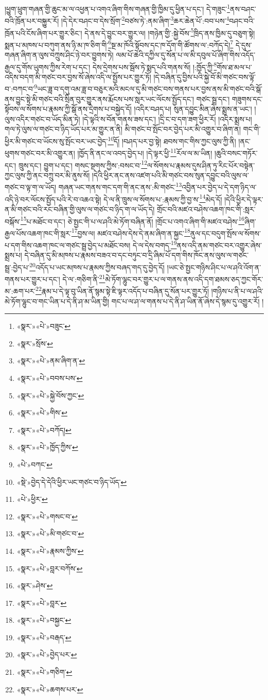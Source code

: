 །ཕྱུག་ཕྲུག་གཞན་གྱི་ཆུང་མ་ལ་འཕྱན་པ་འགའ་ཞིག་གིས་གཞན་གྱི་ཁྱིམ་དུ་ཕྱིན་པ་དང་། དེ་གཟུང་\footnote{«སྣར་»«པེ་»བཟུང་}ནས་བཤང་བའི་ཁྲོན་པར་བསྐྱུར་རོ། །དེ་དེར་བཤང་བ་དེས་སྲོག་\footnote{«སྣར་»སྲོས་}བཙས་ཏེ་:ནམ་ཞིག་\footnote{«སྣར་»«པེ་»ནམ་ཞིག་ན་}ཆར་ཆེན་པོ་:བབ་པས་\footnote{«སྣར་»«པེ་»བབས་པས་}བཤང་བའི་ཁྲོན་པའི་ངོས་ཞིག་པར་གྱུར་ཅིང་། དེ་ནས་དེ་བྱུང་བར་གྱུར་ལ། །གཉེན་གྱི་:སྐྱེ་བོས་\footnote{«སྣར་»«པེ་»སྐྱེ་བོས་ཀྱང་}ཁྲིད་ནས་ཁྱིམ་དུ་བཅུག་སྟེ། སྨན་པ་མཁས་པ་བཀུག་ནས་ཉི་མ་ཁ་ཅིག་གི་\footnote{«སྣར་»«པེ་»གིས་}སྔ་མ་ཁོའི་སྟོབས་དང་ཁ་དོག་གི་ཚོགས་ལ་:བཀོད་དེ།\footnote{«སྣར་»«པེ་»བཀོད།} དེ་དུས་གཞན་ཞིག་ན་ལུས་བཀྲུས་ཤིང་ཉེ་བར་བྱུགས་ཏེ། ལམ་པོ་ཆེའི་དཀྱིལ་དུ་སོན་པ་ལ་མི་དབུལ་པོ་ཞིག་གིས་འདོད་རྒྱལ་དུ་གོས་ཡུགས་ཀྱིས་རེག་པ་དང་། དེས་དྲེགས་པས་སྦོས་ཏེ་སྨད་པའི་གནས་སོ། །:ཁྱོད་ཀྱི་\footnote{«སྣར་»«པེ་»ཁྱོད་ཀྱིས་}གོས་ཐ་མལ་པ་འདིས་བདག་མི་གཙང་བར་བྱས་སོ་ཞེས་འདི་ལ་སྤྱོས་པར་གྱུར་ཏོ། །དེ་བཞིན་དུ་བྱིས་པའི་སྐྱེ་བོ་མི་གཙང་བས་ལྟོ་བ་:བཀང་བ་\footnote{«པེ་»བཀང་}ཡང་ཟླ་བ་དགུ་འམ་ཟླ་བ་བཅུར་མའི་མངལ་དུ་མི་གཙང་བས་གནས་པར་བྱས་ནས་མི་གཙང་བའི་སྒོ་ནས་བྱུང་སྟེ་མི་གཙང་བའི་སྲིན་བུར་གྱུར་ནས་རྨོངས་པས་སླར་ཡང་ལོངས་སྤྱོད་དང་། གཙང་སྦྲ་དང་། གཟུགས་དང་སྟོབས་ལ་སོགས་པ་རྣམས་ཀྱི་སྒོ་ནས་དྲེགས་པ་བསྐྱེད་དོ། །འདིར་བཤད་པ། སུན་དབྱུང་མིན་ཞེས་སྨྲས་ན་ཡང་། །ལུས་འདིར་གཙང་བ་ཡོད་མིན་ཏེ། །དེ་ལྟའི་ས་བོན་གནས་ཟས་དང་། །དྲི་ང་བ་དག་ཟག་ཕྱིར་རོ། །འདིར་སྨྲས་པ། གལ་ཏེ་ལུས་ལ་གཙང་བ་ཉིད་ཡོད་པར་མ་གྱུར་ན་ནི། མི་གཙང་བ་སྤོང་བར་བྱེད་པར་མི་འགྱུར་བ་ཞིག་ན། གང་གི་ཕྱིར་མི་གཙང་བ་ཡོངས་སུ་སྤོང་བར་ཡང་བྱེད་\footnote{«སྡེ་»བྱེད་དེ་དེའི་ཕྱིར་ཡང་གཙང་བ་ཉིད་ཡོད་}དོ། །བཤད་པར་བྱ་སྟེ། ཐབས་གང་གིས་ཀྱང་ལུས་ཀྱི་ནི། །ནང་ཕུགས་གཙང་བར་མི་འགྱུར་ན། །ཁྱོད་ནི་ནང་ལ་འབད་བྱེད་པ། །དེ་ལྟར་ཕྱི་\footnote{«པེ་»ཕྱིར་}རོལ་ལ་མ་ཡིན། །ཆུའི་བསང་གཏོར་དང་། ཁྲུས་དང་། བྱུག་པ་དང་། གསང་སྔགས་ཀྱིས་:བསང་བ་\footnote{«སྣར་»«པེ་»གསང་བ་}ལ་སོགས་པ་རྣམས་དུས་ཤིན་ཏུ་རིང་པོར་བསྟེན་ཀྱང་ལུས་ཀྱི་ནང་བཀྲུ་བར་མི་ནུས་སོ། །དེའི་ཕྱིར་ནང་ནས་འཛག་པའི་མི་གཙང་བས་སུན་དབྱུང་བའི་ལུས་ལ་གཙང་བ་ལྟ་ག་ལ་ཡོད། གཞན་ཡང་གནས་གང་དག་གི་ནང་ནས་:མི་གཙང་\footnote{«སྣར་»«པེ་»མི་གཙང་བ་}འབྱིན་པར་བྱེད་པ་དེ་དག་ཉིད་ལ་འདི་ཉེ་བར་ལོངས་སྤྱོད་པའི་རེ་བ་འཆའ་སྟེ། དེ་ལ་ནི་ཁྲུས་ལ་སོགས་པ་:རྣམས་ཀྱི་བྱ་ས་\footnote{«སྣར་»«པེ་»རྣམས་ཀྱིས་}མེད་དོ། །དེའི་ཕྱིར་དེ་ལྟར་ན་མི་གཙང་བའི་རང་བཞིན་གྱི་ལུས་ལ་གཙང་བ་ཉིད་ག་ལ་ཡོད་དེ། གྲོང་བའི་མཛའ་བཤེས་འཆག་ཁང་གི་:སླར་བསྐོས་\footnote{«སྣར་»«པེ་»བླར་བཀོས་}པ་མཐོང་བ་དང་། ཅེ་སྤྱང་གི་པ་ལ་ཤའི་མེ་ཏོག་བཞིན་ནོ། །གྲོང་པ་འགའ་ཞིག་གི་མཛའ་བཤེས་\footnote{«སྣར་»ཤེས་}ཞིག་རྒྱལ་པོས་འཆག་ཁང་གི་སླར་\footnote{«སྣར་»«པེ་»བླར་}བྱས་ལ། མཛའ་བཤེས་དེས་དེ་ནམ་ཞིག་ན་སྐྱང་\footnote{«སྣར་»«པེ་»བསྐྱང་}ནུལ་དང་བདུག་སྤོས་ལ་སོགས་པ་དག་གིས་འཆག་ཁང་ལ་གཙང་སྦྲ་བྱེད་པ་མཐོང་བས། དེ་ལ་དེས་བགད་\footnote{«སྣར་»«པེ་»བརྒད་}ནས་འདི་ནམ་གཙང་བར་འགྱུར་ཞེས་སྨྲས་པ། དེ་བཞིན་དུ་མི་མཁས་པ་རྣམས་བཟའ་བ་དང་བཏུང་བ་དྲི་ཞིམ་པོ་དག་གིས་ཁོང་ནས་ལུས་ལ་གཙང་སྦྲ་:བྱེད་པ་\footnote{«སྣར་»«པེ་»བྱེད་པར་}འདོད་པ་ཡང་མཁས་པ་རྣམས་ཀྱིས་བཞད་གད་དུ་བྱེད་དོ། །ཡང་ཅེ་སྤྱང་གཉིས་ཤིང་པ་ལ་ཤའི་འོག་ན་གནས་པར་གྱུར་པ་དང་། དེ་ལ་:གཅིག་ནི་\footnote{«སྣར་»«པེ་»གཅིག་}མེ་ཏོག་ལྷུང་བར་གྱུར་པ་ལ་གནས་ནས་འདི་དག་ཐམས་ཅད་ཀྱང་གོར་མ་:ཆག་པར་\footnote{«སྣར་»«པེ་»ཆགས་པར་}རྣམ་པ་དེ་ལྟ་བུ་ཡིན་ནོ་སྙམ་སྟེ་ཇི་ལྟར་འདོད་པ་བཞིན་དུ་སོན་པར་གྱུར་ཏོ། །གཉིས་པ་ནི་པ་ལ་ཤའི་མེ་ཏོག་ལྷུང་བ་གང་ཡིན་པ་དེ་ནི་ཤ་མ་ཡིན་གྱི། གང་པ་ལ་ཤ་ལ་གནས་པ་དེ་ནི་ཤ་ཡིན་ནོ་ཞེས་དེ་སྙམ་དུ་འགྱུར་རོ། །

